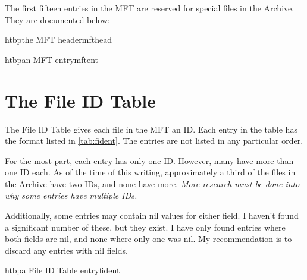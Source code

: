 The first fifteen entries in the MFT are reserved for special files in the
Archive.  They are documented below:

\begin{valuetable}
\end{valuetable}

\begin{datastructure}{htbp}{the MFT header}{mfthead}
\end{datastructure}

\begin{datastructure}{htbp}{an MFT entry}{mftent}


\end{datastructure}


\section{The File ID Table}
\label{sec:fidtab}

The File ID Table gives each file in the MFT an ID.  Each entry in the table
has the format listed in \autoref{tab:fident}.  The entries are not listed in
any particular order.

For the most part, each entry has only one ID.  However, many have more than one
ID each.  As of the time of this writing, approximately a third of the files in
the Archive have two IDs, and none have more.  \emph{More research must be done
into why some entries have multiple IDs.}

Additionally, some entries may contain nil values for either field.  I haven't
found a significant number of these, but they exist.  I have only found entries
where both fields are nil, and none where only one was nil.  My recommendation
is to discard any entries with nil fields.

\begin{datastructure}{htbp}{a File ID Table entry}{fident}
\end{datastructure}

